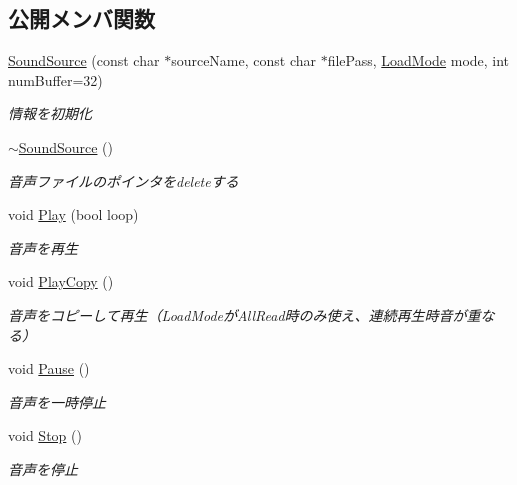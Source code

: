 \subsection*{公開メンバ関数}
\begin{DoxyCompactItemize}
\item 
\mbox{\hyperlink{class_k___audio_1_1_sound_source_adcc7a2e8a6ba4203b9c2ff94649e06d9}{Sound\+Source}} (const char $\ast$source\+Name, const char $\ast$file\+Pass, \mbox{\hyperlink{class_k___audio_1_1_sound_source_ad0e58f4cea821bc4087ed13830b06f69}{Load\+Mode}} mode, int num\+Buffer=32)
\begin{DoxyCompactList}\small\item\em 情報を初期化 \end{DoxyCompactList}\item 
\mbox{\hyperlink{class_k___audio_1_1_sound_source_afe318e8ffc35a8774c36c2dfe7a05546}{$\sim$\+Sound\+Source}} ()
\begin{DoxyCompactList}\small\item\em 音声ファイルのポインタをdeleteする \end{DoxyCompactList}\item 
void \mbox{\hyperlink{class_k___audio_1_1_sound_source_a6d7aca76e2324325dc5f90b1ad3ce8b6}{Play}} (bool loop)
\begin{DoxyCompactList}\small\item\em 音声を再生 \end{DoxyCompactList}\item 
void \mbox{\hyperlink{class_k___audio_1_1_sound_source_ad9647ee76e3d5ae4f7c43f0bdcff2b77}{Play\+Copy}} ()
\begin{DoxyCompactList}\small\item\em 音声をコピーして再生（\+Load\+Modeが\+All\+Read時のみ使え、連続再生時音が重なる） \end{DoxyCompactList}\item 
void \mbox{\hyperlink{class_k___audio_1_1_sound_source_a47974ac6ed248793c8f2385618eb9cc0}{Pause}} ()
\begin{DoxyCompactList}\small\item\em 音声を一時停止 \end{DoxyCompactList}\item 
void \mbox{\hyperlink{class_k___audio_1_1_sound_source_a0c666b4b7b12c5e4412fb519d3786526}{Stop}} ()
\begin{DoxyCompactList}\small\item\em 音声を停止 \end{DoxyCompactList}\item 

\end{DoxyCompactItemize}
